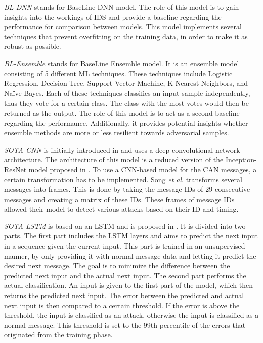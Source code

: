 \documentclass[conference]{IEEEtran}
\newcommand{\etal}{\textit{et al}. }
\begin{document}
\emph{BL-DNN} stands for BaseLine DNN model. The role of this model is to gain insights into the workings of IDS and provide a baseline regarding the performance for comparison between models. This model implements several techniques that prevent overfitting on the training data, in order to make it as robust as possible.

\emph{BL-Ensemble} stands for BaseLine Ensemble model. It is an ensemble model consisting of 5 different ML techniques. These techniques include Logistic Regression, Decision Tree, Support Vector Machine, K-Nearest Neighbors, and Naïve Bayes. Each of these techniques classifies an input sample independently, thus they vote for a certain class. The class with the most votes would then be returned as the output. The role of this model is to act as a second baseline regarding the performance. Additionally, it provides potential insights whether ensemble methods are more or less resilient towards adversarial samples.

\emph{SOTA-CNN} is initially introduced in \cite{In_Vehicle_Network_Intrusion_Detection_Deep_Convolutional_Neural_Network_2020} and uses a deep convolutional network architecture. The architecture of this model is a reduced version of the Inception-ResNet model proposed in \cite{inception_resnet_2017}. To use a CNN-based model for the CAN messages, a certain transformation has to be implemented. Song \etal \cite{In_Vehicle_Network_Intrusion_Detection_Deep_Convolutional_Neural_Network_2020} transforms several messages into frames. This is done by taking the message IDs of 29 consecutive messages and creating a matrix of these IDs. %
These frames of message IDs allowed their model to detect various attacks based on their ID and timing.

\emph{SOTA-LSTM} is based on an LSTM and is proposed in \cite{Anomaly_Detection_Automobile_Control_Network_Data_LSTM_2016}. It is divided into two parts. The first part includes the LSTM layers and aims to predict the next input in a sequence given the current input. This part is trained in an unsupervised manner, by only providing it with normal message data and letting it predict the desired next message. The goal is to minimize the difference between the predicted next input and the actual next input. The second part performs the actual classification. An input is given to the first part of the model, which then returns the predicted next input. The error between the predicted and actual next input is then compared to a certain threshold. If the error is above the threshold, the input is classified as an attack, otherwise the input is classified as a normal message. This threshold is set to the 99th percentile of the errors that originated from the training phase.
\end{document}
